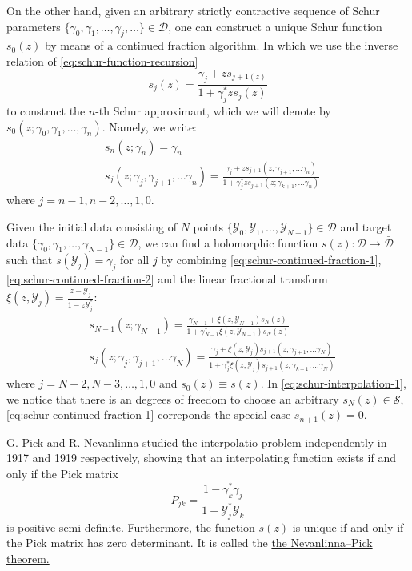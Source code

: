 \documentclass[
	preprint,%
	aps,
	prb,
	showpacs,	
	amsmath, amssymb]{revtex4-2}
\DeclareRobustCommand{\+}{\hstretch{1.25} {\boldsymbol {\mathrel{+}}}}
\newcommand{\Y}{ {\mathcal{Y}} }
\newcommand{\D}{ {\mathcal{D}} }
\newcommand{\Dbar}{ {\bar{\mathcal{D}}} }
\begin{document}
On the other hand, given an arbitrary strictly contractive sequence 
of Schur parameters $\{\gamma_0, \gamma_1, \dots, \gamma_j, \dots\} \in \D$, 
one can construct a unique Schur function $s_0(z)$ by means of a continued 
fraction algorithm. In which we use the inverse relation of
\cref{eq:schur-function-recursion}
\begin{equation}\label{eq:inv-schur-function-recursion}
	s_j(z) = \frac{\gamma_j + zs_{j+1(z)}}{1 + \gamma_j^* z s_j(z)}
\end{equation}
to construct the $n$-th Schur approximant, 
which we will denote by 
$s_0(z; \gamma_0,\gamma_1, \dots, \gamma_n)$. Namely, we write:
\begin{align}
	\label{eq:schur-continued-fraction-1}
	&s_n(z;\gamma_n) = \gamma_n \\
	\label{eq:schur-continued-fraction-2}
	&s_j(z;\gamma_j,\gamma_{j+1},\dots \gamma_n) 
	= \frac{\gamma_j + zs_{j+1}(z;\gamma_{j+1},\dots \gamma_n)}
		{1 + \gamma_j^* z s_{j+1}(z;\gamma_{k+1},\dots \gamma_n)}
\end{align}
where $j = n-1, n-2, \dots, 1, 0$.

Given the initial data consisting of $N$ points 
$\{\Y_0, \Y_1, \dots ,\Y_{N-1}\} \in \D$ and target data
$\{\gamma_0, \gamma_1, \dots ,\gamma_{N-1}\} \in \D$, 
we can find a holomorphic function $s(z): \D \to \Dbar$ 
such that $s(\Y_j) = \gamma_j$ for all $j$ by combining 
\cref{eq:schur-continued-fraction-1}, \cref{eq:schur-continued-fraction-2} 
and the linear fractional transform 
$\xi(z, \Y_j) = \frac{z - \Y_j}{1 - z\Y_j^*}$:
\begin{align}
	\label{eq:schur-interpolation-1}
	&s_{N-1}(z;\gamma_{N-1}) 
		= \frac{\gamma_{N-1} + \xi(z,\Y_{N-1})s_N(z)}
			{1 + \gamma_{N-1}^*\xi(z,\Y_{N-1})s_N(z)} \\
	\label{eq:schur-interpolation-2}
	&s_j(z;\gamma_j,\gamma_{j+1},\dots \gamma_N) 
		= \frac{\gamma_j + \xi(z,\Y_{j})s_{j+1}(z;\gamma_{j+1},\dots \gamma_N)}
			{1 + \gamma_j^* \xi(z,\Y_{j})s_{j+1}(z;\gamma_{k+1},\dots \gamma_N)}
\end{align}
where $j = N-2, N-3, \dots, 1, 0$ and $s_0(z) \equiv s(z)$. In \cref{eq:schur-interpolation-1}, 
we notice that there is an degrees of freedom to choose an 
arbitrary $s_N(z) \in \mathcal{S}$, \cref{eq:schur-continued-fraction-1} 
correponds the special case $s_{n+1}(z) = 0$.

G. Pick and R. Nevanlinna studied the interpolatio problem 
independently in 1917\cite{Pick1917} and 1919\cite{nevanlinna1919uber} 
respectively, showing that an 
interpolating function exists if and only if the Pick matrix
\begin{equation}\label{eq:pick-matrix-origional}
	P_{jk} = \frac{1-\gamma_k^* \gamma_j}{1 - \Y_j^* \Y_k}
\end{equation}
is positive semi-definite. Furthermore, the function $s(z)$ is 
unique if and only if the Pick matrix has zero determinant. It 
is called the 
\href{https://en.wikipedia.org/wiki/Nevanlinna%E2%80%93Pick_interpolation}
	{the Nevanlinna–Pick theorem.}
\end{document}
